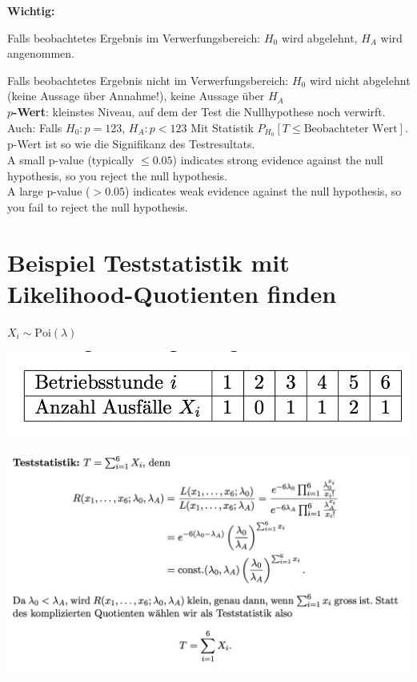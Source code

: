 \textbf{Wichtig:}

Falls beobachtetes Ergebnis im Verwerfungsbereich: $H_0$ wird abgelehnt, $H_A$ wird angenommen.

Falls beobachtetes Ergebnis nicht im Verwerfungsbereich: $H_0$ wird nicht abgelehnt (keine Aussage über Annahme!), keine Aussage über $H_A$\\

\textbf{$p$-Wert}: kleinstes Niveau, auf dem der Test die Nullhypothese noch verwirft.\\

Auch: Falls $H_0: p = 123$, $H_A: p < 123$ Mit Statistik $P_{H_0}[T\leq \text{Beobachteter Wert}]$. p-Wert ist so wie die Signifikanz des Testresultats.\\

A small p-value (typically $\leq 0.05$) indicates strong evidence against the null hypothesis, so you reject the null hypothesis.\\

A large p-value ($> 0.05$) indicates weak evidence against the null hypothesis, so you fail to reject the null hypothesis.

\section{Beispiel Teststatistik mit Likelihood-Quotienten finden}

$X_i \sim \text{Poi}(\lambda)$ 

\includegraphics[width=.4\textwidth]{images/likelihood1}

\includegraphics[width=\textwidth]{images/likelihood2}

